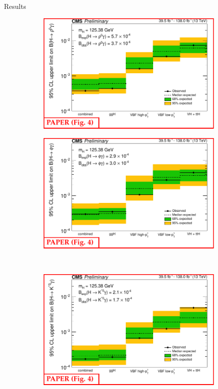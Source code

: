 \documentclass[9pt,aspectratio=1610]{beamer}
\begin{document}
\begin{frame}{Results}
	\begin{figure}
		\begin{subfigure}{.36\textwidth}
			\centering
			\includegraphics[width=\textwidth]{figures/23-005-v07-marked-figs/fig4-top-right.pdf}
		\end{subfigure}%
		\begin{subfigure}{.36\textwidth}
			\centering
			\includegraphics[width=\textwidth]{figures/23-005-v07-marked-figs/fig4-top-left.pdf}
		\end{subfigure}\\
		\begin{subfigure}{.36\textwidth}
			\centering
			\includegraphics[width=\textwidth]{figures/23-005-v07-marked-figs/fig4-bottom.pdf}

\end{subfigure}
\end{figure}
\end{frame}
\end{document}
